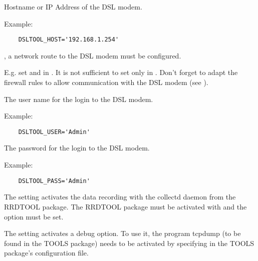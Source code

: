 \begin{description}
  Hostname or IP Address of the DSL modem.

  Example:

\begin{example}
\begin{verbatim}
    DSLTOOL_HOST='192.168.1.254'
\end{verbatim}
\end{example}

  , a network route to the DSL modem must be configured.

  E.g. set  and 
  in . It is not sufficient to set  only in .
  Don't forget to adapt the firewall rules to allow communication with the DSL modem
  (see ).


  The user name for the login to the DSL modem.

  Example:

\begin{example}
\begin{verbatim}
    DSLTOOL_USER='Admin'
\end{verbatim}
\end{example}


  The password for the login to the DSL modem.

  Example:

\begin{example}
\begin{verbatim}
    DSLTOOL_PASS='Admin'
\end{verbatim}
\end{example}


  The setting  activates the data recording with the collectd daemon
  from the RRDTOOL package.
  The RRDTOOL package must be activated with  and
  the option  must be set.


  The setting  activates a debug option. To use it, the
  program tcpdump (to be found in the TOOLS package) needs to be activated
  by specifying  in the TOOLS package's configuration file.


\end{description}

